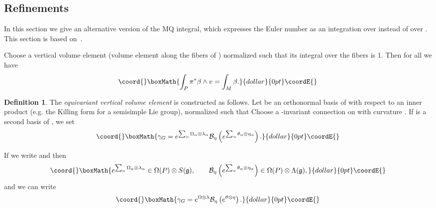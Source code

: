 \documentclass[a4paper,12pt,reqno,sumlimits]{amsart}
\theoremstyle{plain}
\theoremstyle{definition}
\newtheorem{defn}[thm]{Definition}
\providecommand{\1}{{\bf 1}}
\providecommand{\g}{{\mathfrak  g}}
\providecommand{\ex}[1]{{e^{#1}}}
\providecommand{\calB}{{\mathcal B}}
\renewcommand{\to}{\longrightarrow}
\numberwithin{equation}{section}
\begin{document}

\subsection{Refinements}
\label{mqrefinements}

In this section we give an alternative version of the MQ integral, which
expresses the Euler number as an integration over \coordHE{} instead of over \coordHE{}.
This section is based on~\cite[Sec. 2.4, 2.6]{radu}.

Choose a vertical volume element \coordHE{} (volume element along the fibers of
\myHighlight{$\pi:P\to M$}\coordHE{}) normalized such that its integral over the fibers is 1.  Then
for all \coordHE{} we have
$$\coord{}\boxMath{
\int_P \pi^*\beta\wedge v = \int_M \beta.
}{dollar}{0pt}\coordE{}$$

\begin{defn}
  The {\em equivariant vertical volume element} \myHighlight{$\gamma_G\in\Omega(P)\otimes
  S(\g)$}\coordHE{} is constructed as follows.  Let \myHighlight{$\lambda_1,\dots,\lambda_{\dim{\g}}$}\coordHE{}
  be an orthonormal basis of \myHighlight{$\g$}\coordHE{} with respect to an inner product (e.g. the
  Killing form for a semisimple Lie group), normalized such that
  \coordHE{} Choose a \coordHE{}-invariant connection \myHighlight{$\theta$}\coordHE{} on \coordHE{} with
  curvature \myHighlight{$\Omega$}\coordHE{}. If \myHighlight{$\eta=(\eta_1,\dots,\eta_{\dim{\g}})$}\coordHE{} is a second
  basis of \myHighlight{$\g$}\coordHE{}, we set
  $$\coord{}\boxMath{
  \gamma_G = \ex{\sum_\alpha\Omega_\alpha\otimes\lambda_\alpha}
  \calB_\eta\left(\ex{\sum_\alpha\theta_\alpha\otimes\eta_\alpha}\right).
  }{dollar}{0pt}\coordE{}$$
\end{defn}

If we write \myHighlight{$\theta=\theta_\alpha\otimes\lambda_\alpha,$}\coordHE{} and
\myHighlight{$\Omega=\Omega_\alpha\otimes\lambda_\alpha,$}\coordHE{} then
$$\coord{}\boxMath{
\ex{\sum_\alpha\Omega_\alpha\otimes\lambda_\alpha}\in \Omega(P)\otimes
S(\g),\qquad
\calB_\eta\left(\ex{\sum_\alpha\theta_\alpha\otimes\eta_\alpha}\right)\in
\Omega(P)\otimes\Lambda(\g),
}{dollar}{0pt}\coordE{}$$
and we can write
$$\coord{}\boxMath{
\gamma_G= \ex{\Omega\otimes\lambda}
\calB_\eta\left(\ex{\theta\otimes\eta}\right).
}{dollar}{0pt}\coordE{}$$
\end{document}
